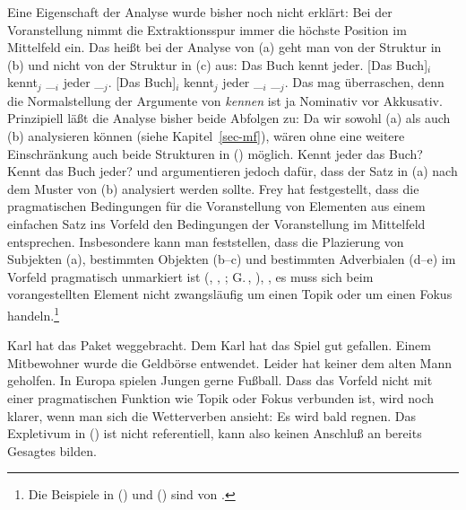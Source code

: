 Eine Eigenschaft der Analyse wurde bisher noch nicht erklärt: Bei der Voranstellung nimmt
die Extraktionsspur immer die höchste Position im Mittelfeld ein. Das heißt bei der Analyse
von (a) geht man von der Struktur in (b) und nicht von der Struktur in (c) aus:
\eal
\ex Das Buch kennt jeder.
\ex {}[Das Buch]$_i$ kennt$_j$ \_$_i$ jeder \_$_j$.
\ex {}[Das Buch]$_i$ kennt$_j$ jeder \_$_i$ \_$_j$.
\zl
Das mag überraschen, denn die Normalstellung der Argumente von \emph{kennen} ist ja Nominativ vor Akkusativ.
Prinzipiell läßt die Analyse bisher beide Abfolgen zu: Da wir sowohl (a) als auch (b)
analysieren können (siehe Kapitel~\ref{sec-mf}), wären ohne eine weitere Einschränkung
auch beide Strukturen in () möglich.%
\eal
\ex Kennt jeder das Buch?
\ex Kennt das Buch jeder?
\zl
\citet{Fanselow2003d} und \citet{Frey2004a} argumentieren jedoch dafür, dass der Satz in (a) nach dem
Muster von (b) analysiert werden sollte. Frey hat festgestellt, dass die pragmatischen
Bedingungen für die Voranstellung von Elementen aus einem einfachen Satz ins Vorfeld den Bedingungen der Voranstellung
im Mittelfeld entsprechen. Insbesondere kann man feststellen, dass die Plazierung von Subjekten (a), 
bestimmten Objekten (b--c) und bestimmten Adverbialen (d--e) im Vorfeld pragmatisch
unmarkiert 
ist (\citealp{Lenerz77}, \citealp[--74]{Haider84c}, \citealp{Fanselow2003d};
G.\,\citealp[]{GMueller2004a}, \citealp{Frey2004a}), 
\dash, es muss sich beim vorangestellten Element nicht zwangsläufig 
um einen Topik oder um einen Fokus handeln.\footnote{
  Die Beispiele in () und () sind von \citet{Frey2004a}. 
}

\eal
\label{bsp-voranstellung-pragmatik}
\ex Karl hat das Paket weggebracht.
\ex Dem Karl hat das Spiel gut gefallen.
\ex Einem Mitbewohner wurde die Geldbörse entwendet.
\ex Leider hat keiner dem alten Mann geholfen.
\ex In Europa spielen Jungen gerne Fußball.
\zl
Dass das Vorfeld nicht mit einer pragmatischen Funktion wie Topik oder Fokus verbunden ist,
wird noch klarer, wenn man sich die Wetterverben ansieht:
\ea
Es wird bald regnen.
\z
Das Expletivum in () ist nicht referentiell, kann also keinen Anschluß an bereits Gesagtes bilden.

